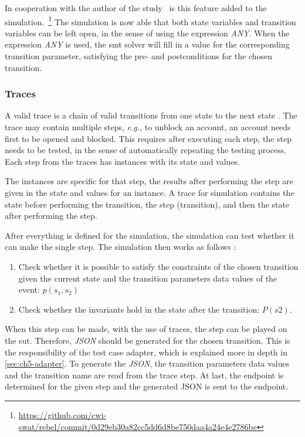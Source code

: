 In cooperation with the author of the study~\cite{stoel_storm_vinju_bosman_2016} is this feature added to the simulation.~\footnote{\url{https://github.com/cwi-swat/rebel/commit/0d29eb30a82cc5dd6d8be750daa4a24e4e2786be}}
The simulation is now able that both state variables and transition variables
can be left open, in the sense of using the expression \textit{ANY}. When the
expression \textit{ANY} is used, the \gls{smt} solver will fill in a value for the
corresponding transition parameter, satisfying the pre- and postconditions for
the chosen transition. 

\subsubsection*{Traces}\label{sec:ch5-traces}
A valid trace is a chain of valid transitions from one state to the next state
\cite[p.5]{stoel_storm_vinju_bosman_2016}. The trace may contain multiple steps,
\textit{e.g.}, to unblock an account, an account needs first to be opened and
blocked. This requires after executing each step, the step needs to be tested,
in the sense of automatically repeating the testing process. Each step from the
traces has instances with its state and values.

The instances are specific
for that step, the results after performing the step are given in the state and
values for an instance. A trace for simulation contains the state before
performing the transition, the step (transition), and then the state after
performing the step.

After everything is defined for the simulation, the simulation can test whether
it can make the single step. The simulation then works as follows
\cite[p.6]{stoel_storm_vinju_bosman_2016}:
\begin{enumerate}
\item Check whether it is possible to satisfy the constraints of the chosen
transition given the current state and the transition parameters data values of
the event: $p(s_{1}, s_{2})$
\item Check whether the invariants hold in the state after the transition:
$P(s2)$.
\end{enumerate}

When this step can be made, with the use of traces, the step can be played on
the \gls{sut}. Therefore, \textit{JSON} should be generated for the chosen
transition. This is the responsibility of the test case adapter, which is
explained more in depth in \autoref{sec:ch5-adapter}. To generate the
\textit{JSON}, the transition parameters data values and
the transition name are read from the trace step. At last, the endpoint is
determined for the given step and the generated JSON is sent to the endpoint.

